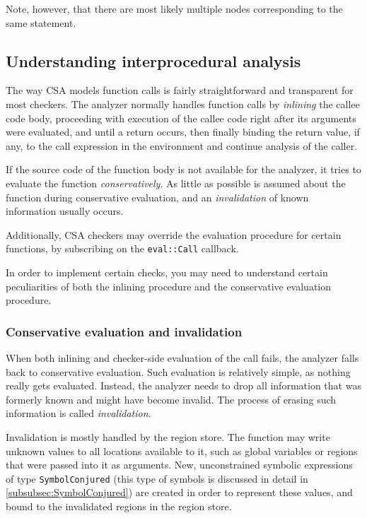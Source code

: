 \documentclass[a4paper,12pt]{article}
\begin{document}
Note, however, that there are most likely multiple nodes corresponding to the same statement.

\subsection{Understanding interprocedural analysis}\label{subsec:ipa}

The way CSA models function calls is fairly straightforward and transparent for most checkers. The analyzer normally handles function calls by \emph{inlining} the callee code body, proceeding with execution of the callee code right after its arguments were evaluated, and until a return occurs, then finally binding the return value, if any, to the call expression in the environment and continue analysis of the caller.

If the source code of the function body is not available for the analyzer, it tries to evaluate the function \emph{conservatively}. As little as possible is assumed about the function during conservative evaluation, and an \emph{invalidation} of known information usually occurs.

Additionally, CSA checkers may override the evaluation procedure for certain functions, by subscribing on the \lstinline|eval::Call| callback.

In order to implement certain checks, you may need to understand certain peculiarities of both the inlining procedure and the conservative evaluation procedure.

\subsubsection{Conservative evaluation and invalidation}

When both inlining and checker-side evaluation of the call fails, the analyzer falls back to conservative evaluation. Such evaluation is relatively simple, as nothing really gets evaluated. Instead, the analyzer needs to drop all information that was formerly known and might have become invalid. The process of erasing such information is called \emph{invalidation}.

Invalidation is mostly handled by the region store. The function may write unknown values to all locations available to it, such as global variables or regions that were passed into it as arguments. New, unconstrained symbolic expressions of type \lstinline|SymbolConjured| (this type of symbols is discussed in detail in \ref{subsubsec:SymbolConjured}) are created in order to represent these values, and bound to the invalidated regions in the region store.
\end{document}
